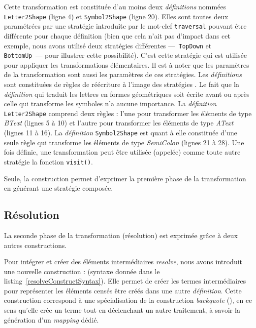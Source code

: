 Cette transformation est constituée d'au moins deux \emph{définitions} nommées
\texttt{Letter2Shape} (ligne 4) et \texttt{Symbol2Shape} (ligne 20). Elles sont
toutes deux paramétrées par une stratégie introduite par le mot-clef
\texttt{traversal} pouvant être différente pour chaque définition (bien que
cela n'ait pas d'impact dans cet exemple, nous avons utilisé deux stratégies
différentes ---~\texttt{TopDown} et \texttt{BottomUp}~--- pour illustrer cette
possibilité). C'est cette stratégie qui est utilisée pour appliquer les
transformations élémentaires. Il est à noter que les paramètres de la
transformation sont aussi les paramètres de ces stratégies. Les
\emph{définitions} sont constituées de règles de réécriture à l'image des
stratégies {\tom}. Le fait que la \emph{définition} qui traduit les lettres en
formes géométriques soit écrite avant ou après celle qui transforme les
symboles n'a aucune importance. La \emph{définition} \texttt{Letter2Shape}
comprend deux règles : l'une pour transformer les éléments de type \emph{BText}
(lignes 5 à 10) et l'autre pour transformer les éléments de type \emph{AText}
(lignes 11 à 16). La \emph{définition} \texttt{Symbol2Shape} est quant à elle
constituée d'une seule règle qui transforme les éléments de type
\emph{SemiColon} (lignes 21 à 28). Une fois définie, une transformation peut
être utilisée (appelée) comme toute autre stratégie {\tom} {\via} la fonction
\texttt{visit()}.

Seule, la construction  permet d'exprimer la première
phase de la transformation en générant une stratégie composée.


\subsection{Résolution}

La seconde phase de la transformation (résolution) est exprimée grâce à deux
autres constructions. 

Pour intégrer et créer des éléments intermédiaires \emph{resolve}, nous avons
introduit une nouvelle construction :  (syntaxe donnée dans le
listing~\ref{resolveConstructSyntax}). Elle permet de créer les termes
intermédiaires pour représenter les éléments censés être créés dans une autre
\emph{définition}. Cette construction correspond à une spécialisation de la
construction \emph{backquote} (), en ce sens qu'elle crée un terme tout
en déclenchant un autre traitement, à savoir la génération d'un \emph{mapping}
dédié.

